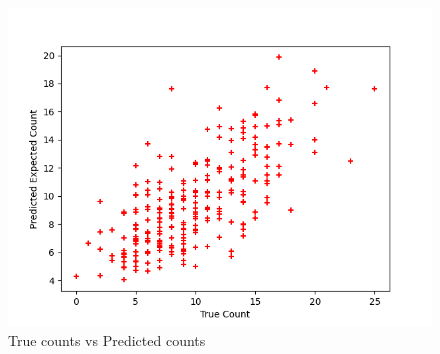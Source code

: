 \begin{answer}
	\begin{figure}[h!]
\centering
  \includegraphics[width=.7\linewidth]{poisson/poisson_pred.png}
\caption{True counts vs Predicted counts}
\label{fig:test}
\end{figure}
\end{answer}
